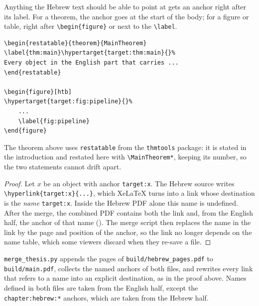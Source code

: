 \label{sec:objects}

Anything the Hebrew text should be able to point at gets an anchor right after its label.
For a theorem, the anchor goes at the start of the body; for a figure or table, right after \verb|\begin{figure}| or next to the \verb|\label|.

\begin{lstlisting}
\begin{restatable}{theorem}{MainTheorem}
\label{thm:main}\hypertarget{target:thm:main}{}%
Every object in the English part that carries ...
\end{restatable}

\begin{figure}[htb]
\hypertarget{target:fig:pipeline}{}%
    ...
    \label{fig:pipeline}
\end{figure}
\end{lstlisting}

The theorem above uses \texttt{restatable} from the \texttt{thmtools} package: it is stated in the introduction and restated here with \verb|\MainTheorem*|, keeping its number, so the two statements cannot drift apart.

\MainTheorem*

\begin{proof}
Let $x$ be an object with anchor \texttt{target:x}.
The Hebrew source writes \verb|\hyperlink{target:x}{...}|, which XeLaTeX turns into a link whose destination is the \emph{name} \texttt{target:x}.
Inside the Hebrew PDF alone this name is undefined.
After the merge, the combined PDF contains both the link and, from the English half, the anchor of that name ().
The merge script then replaces the name in the link by the page and position of the anchor, so the link no longer depends on the name table, which some viewers discard when they re-save a file.
\end{proof}

\label{sec:merge}

\texttt{merge\_thesis.py} appends the pages of \texttt{build/hebrew\_pages.pdf} to \texttt{build/main.pdf}, collects the named anchors of both files, and rewrites every link that refers to a name into an explicit destination, as in the proof above.
Names defined in both files are taken from the English half, except the \texttt{chapter:hebrew:*} anchors, which are taken from the Hebrew half.

